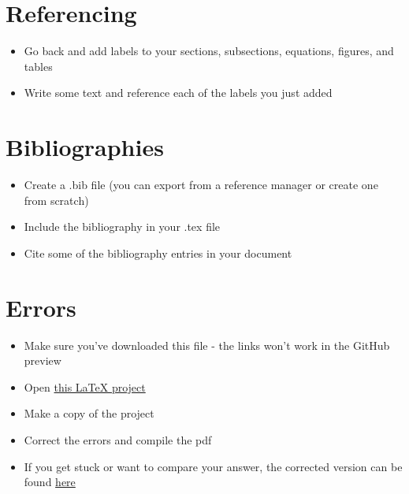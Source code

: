 \documentclass[11pt,a4paper]{article}
\begin{document}
\section{Referencing}
\begin{itemize}
\item Go back and add labels to your sections, subsections, equations, figures, and tables
\item Write some text and reference each of the labels you just added
\end{itemize}

\section{Bibliographies}
\begin{itemize}
\item Create a .bib file (you can export from a reference manager or create one from scratch)
\item Include the bibliography in your .tex file
\item Cite some of the bibliography entries in your document
\end{itemize}

\section{Errors}\label{sec:errors}
\begin{itemize}
\item Make sure you've downloaded this file - the links won't work in the GitHub preview
\item Open \href{https://www.overleaf.com/read/gnzphcnqgfvf}{this LaTeX project}
\item Make a copy of the project
\item Correct the errors and compile the pdf
\item If you get stuck or want to compare your answer, the corrected version can be found \href{https://www.overleaf.com/read/zsmyvxvdcvfr}{here}
\end{itemize}
\end{document}

